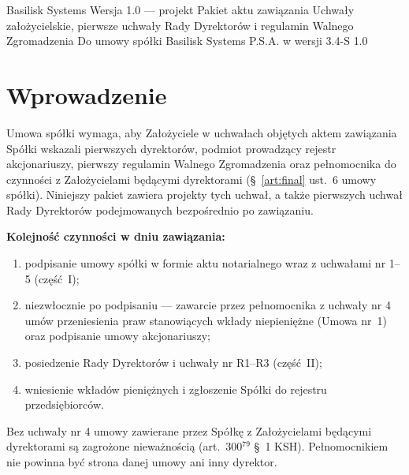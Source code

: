 \documentclass[11pt,a4paper]{report}
\newcommand{\US}[1]{§~#1 umowy spółki}
\begin{document}
\BusinessPlanTitlePage
  {Basilisk Systems}
  {Wersja 1.0 --- projekt}
  {Pakiet aktu zawiązania}
  {Uchwały założycielskie, pierwsze uchwały Rady Dyrektorów i regulamin Walnego Zgromadzenia}
  {Do umowy spółki Basilisk Systems P.S.A. w wersji 3.4-S}
  {1.0}

\tableofcontents
\newpage

\chapter*{Wprowadzenie}

Umowa spółki wymaga, aby Założyciele w uchwałach objętych aktem zawiązania Spółki wskazali pierwszych dyrektorów, podmiot prowadzący rejestr akcjonariuszy, pierwszy regulamin Walnego Zgromadzenia oraz pełnomocnika do czynności z Założycielami będącymi dyrektorami (\US{\ref{art:final} ust.~6}). Niniejszy pakiet zawiera projekty tych uchwał, a także pierwszych uchwał Rady Dyrektorów podejmowanych bezpośrednio po zawiązaniu.

\textbf{Kolejność czynności w dniu zawiązania:}
\begin{enumerate}
  \item podpisanie umowy spółki w formie aktu notarialnego wraz z uchwałami nr 1--5 (część~I);
  \item niezwłocznie po podpisaniu --- zawarcie przez pełnomocnika z uchwały nr 4 umów przeniesienia praw stanowiących wkłady niepieniężne (Umowa nr~1) oraz podpisanie umowy akcjonariuszy;
  \item posiedzenie Rady Dyrektorów i uchwały nr R1--R3 (część~II);
  \item wniesienie wkładów pieniężnych i zgłoszenie Spółki do rejestru przedsiębiorców.
\end{enumerate}

Bez uchwały nr 4 umowy zawierane przez Spółkę z Założycielami będącymi dyrektorami są zagrożone nieważnością (art.~300$^{79}$ §~1 KSH). Pełnomocnikiem nie powinna być strona danej umowy ani inny dyrektor.
\end{document}
